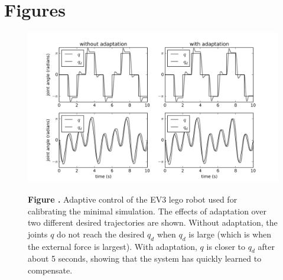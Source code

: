 \documentclass{frontiersSCNS} %
\begin{document}

\section*{Figures}


\begin{figure}[h!]
\begin{center}
\includegraphics[width=18cm]{figures/fig_ev3}
\end{center}
 \textbf{\label{fig:ev3} Figure .}{ Adaptive control of the EV3 lego robot used for calibrating the minimal simulation.
 The effects of adaptation over two different desired trajectories are shown.  Without adaptation, the joints $q$ do not reach the desired $q_d$ when $q_d$ is large (which
 is when the external force is largest).  With adaptation, $q$ is closer to $q_d$ after about 5 seconds, showing that the system has quickly learned to compensate.}
\end{figure}




\end{document}
